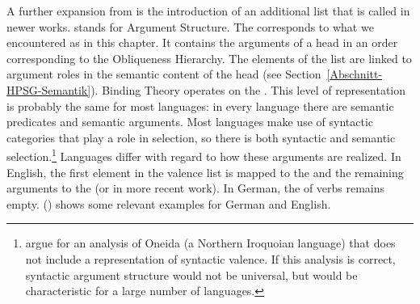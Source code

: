 A further expansion from  is the introduction of an additional list that is
called \argst{} in newer works. \argst stands for Argument Structure. The \argstl
corresponds to what we encountered as \subcatl in this chapter.  It contains the arguments of a head
in an order corresponding to the Obliqueness Hierarchy. The elements of the list are linked to
argument roles in the semantic content of the head (see Section~\ref{Abschnitt-HPSG-Semantik}). Binding Theory operates on the \argstl. This level of
representation is probably the same for most languages: in every language there are semantic predicates and
semantic arguments. Most languages make use of syntactic categories that play a role in
selection, so there is both syntactic and semantic selection.\footnote{%
  \citet{KM2012a} argue for an analysis of Oneida (a Northern Iroquoian language) that does not
  include a representation of syntactic valence. If this analysis is correct, syntactic argument
  structure would not be universal, but would be characteristic for a large number of languages.
}
Languages differ with regard to how these arguments are realized.  In English, the first
element in the valence list is mapped to the \sprl and the remaining arguments to the \subcat (or
\compsl in more recent work). In German, the \sprl of verbs remains empty. () shows some relevant examples for
German and English.

